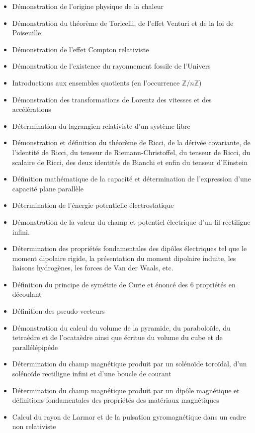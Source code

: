\begin{itemize}
\begin{itemize}[noitemsep]
			\item Démonstration de l'origine physique de la chaleur
				\item Démonstration du théorème de Toricelli, de l'effet Venturi et de la loi de Poiseuille
				\item Démonstration de l'effet Compton relativiste
				\item Démonstration de l'existence du rayonnement fossile de l'Univers
				\item Introductions aux ensembles quotients (en l'occurrence $\mathbb{Z}/n\mathbb{Z}$)
				\item Démonstration des transformations de Lorentz des vitesses et des accélérations
				\item Détermination du lagrangien relativiste d'un système libre
				\item Démonstration et définition du théorème de Ricci, de la dérivée covariante, de l'identité de Ricci, du tenseur de Riemann-Christoffel, du tenseur de Ricci, du scalaire de Ricci, des deux identités de Bianchi et enfin du tenseur d'Einstein
				\item Définition mathématique de la capacité et détermination de l'expression d'une capacité plane parallèle 
				\item Détermination de l'énergie potentielle électrostatique
				\item Démonstration de la valeur du champ et potentiel électrique d'un fil rectiligne infini.
				\item Détermination des propriétés fondamentales des dipôles électriques tel que le moment dipolaire rigide, la présentation du moment dipolaire induite, les liaisons hydrogènes, les forces de Van der Waals, etc.
				\item Définition du principe de symétrie de Curie et énoncé des 6 propriétés en découlant
				\item Définition des pseudo-vecteurs
				\item Démonstration du calcul du volume de la pyramide, du paraboloïde, du tetraèdre et de l'ocataèdre ainsi que écritue du volume du cube et de parallélépipéde
				\item Détermination du champ magnétique produit par un solénoïde toroïdal, d'un solénoïde rectiligne infini et d'une boucle de courant
				\item Détermination du champ magnétique produit par un dipôle magnétique et définitions fondamentales des propriétés des matériaux magnétiques 
				\item Calcul du rayon de Larmor et de la pulsation gyromagnétique dans un cadre non relativiste

\end{itemize}
\end{itemize}
